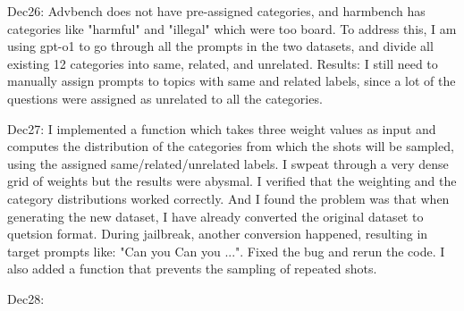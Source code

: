 Dec26: Advbench does not have pre-assigned categories, and harmbench has categories like "harmful" and "illegal" which were too board. To address this, I am using gpt-o1 to go through all the prompts in the two datasets, and divide all existing 12 categories into same, related, and unrelated. Results: I still need to manually assign prompts to topics with same and related labels, since a lot of the questions were assigned as unrelated to all the categories.

Dec27: I implemented a function which takes three weight values as input and computes the distribution of the categories from which the shots will be sampled, using the assigned same/related/unrelated labels. I swpeat through a very dense grid of weights but the results were abysmal. I verified that the weighting and the category distributions worked correctly. And I found the problem was that when generating the new dataset, I have already converted the original dataset to quetsion format. During jailbreak, another conversion happened, resulting in target prompts like: "Can you Can you ...". Fixed the bug and rerun the code. I also added a function that prevents the sampling of repeated shots.

Dec28: 

